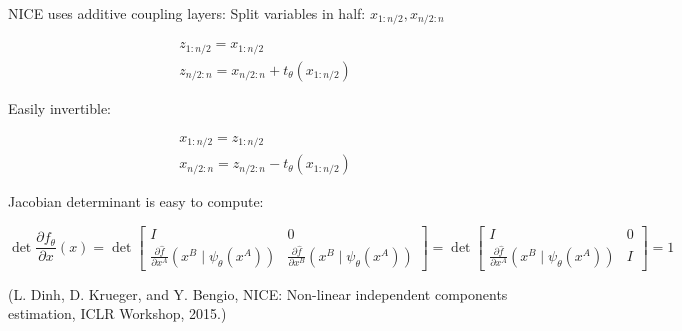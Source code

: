\documentclass{report}
\begin{document}
\begin{definition}
    NICE uses additive coupling layers:
    Split variables in half: $x_{1: n / 2}, x_{n / 2: n}$

    $$
    \begin{aligned}
    & z_{1: n / 2}=x_{1: n / 2} \\
    & z_{n / 2: n}=x_{n / 2: n}+t_{\theta}\left(x_{1: n / 2}\right)
    \end{aligned}
    $$

    Easily invertible:

    $$
    \begin{aligned}
    & x_{1: n / 2}=z_{1: n / 2} \\
    & x_{n / 2: n}=z_{n / 2: n}-t_{\theta}\left(x_{1: n / 2}\right)
    \end{aligned}
    $$

    Jacobian determinant is easy to compute:

    $$
    \operatorname{det} \frac{\partial f_{\theta}}{\partial x}(x)=\operatorname{det}\left[\begin{array}{cc}I & 0 \\ \frac{\partial \hat{f}}{\partial x^{A}}\left(x^{B} \mid \psi_{\theta}\left(x^{A}\right)\right) & \frac{\partial \hat{f}}{\partial x^{B}}\left(x^{B} \mid \psi_{\theta}\left(x^{A}\right)\right)\end{array}\right]=\operatorname{det}\left[\begin{array}{cc}I & 0 \\ \frac{\partial \hat{f}}{\partial x^{A}}\left(x^{B} \mid \psi_{\theta}\left(x^{A}\right)\right) & I\end{array}\right]=1
    $$

    (L. Dinh, D. Krueger, and Y. Bengio, NICE: Non-linear independent components estimation, ICLR Workshop, 2015.)
\end{definition}
\end{document}
